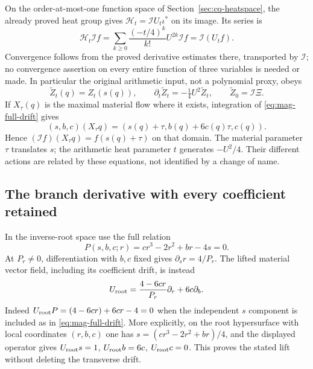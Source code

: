 On the order-at-most-one function space of
Section~\ref{sec:cq-heatspace}, the already proved heat group gives
$\mathscr H_t=\mathcal I U_t\iota^*$ on its image. Its series is
\[
 \mathscr H_t\mathcal I f
 =\sum_{k\ge0}\frac{(-t/4)^k}{k!}U^{2k}\mathcal I f
 =\mathcal I(U_tf).
\]
Convergence follows from the proved derivative estimates there, transported
by $\mathcal I$; no convergence assertion on every entire function of three
variables is needed or made. In particular the original arithmetic input,
not a polynomial proxy, obeys
\begin{equation}
 \widetilde Z_t(q)=Z_t(s(q)),\qquad
 \partial_t\widetilde Z_t=-\tfrac14U^2\widetilde Z_t,\qquad
 \widetilde Z_0=\mathcal I\Xi .
 \label{eq:mag-actual-heat}
\end{equation}
If $X_\tau(q)$ is the maximal material flow where it exists, integration
of \eqref{eq:mag-full-drift} gives
\[
 (s,b,c)(X_\tau q)=(s(q)+\tau,b(q)+6c(q)\tau,c(q)).
\]
Hence $(\mathcal I f)(X_\tau q)=f(s(q)+\tau)$ on that domain.
The material parameter $\tau$ translates $s$; the arithmetic heat
parameter $t$ generates $-U^2/4$. Their different actions are related
by these equations, not identified by a change of name.

\subsection{The branch derivative with every coefficient retained}

In the inverse-root space use the full relation
\[
 P(s,b,c;r)=cr^3-2r^2+br-4s=0.
\]
At $P_r\ne0$, differentiation with $b,c$ fixed gives
$\partial_s r=4/P_r$. The lifted material vector field, including its
coefficient drift, is instead
\begin{equation}
 U_{\rm root}=\frac{4-6cr}{P_r}\partial_r+6c\partial_b .
 \label{eq:mag-root-drift}
\end{equation}
Indeed $U_{\rm root}P=(4-6cr)+6cr-4=0$ when the independent $s$
component is included as in \eqref{eq:mag-full-drift}. More explicitly,
on the root hypersurface with local coordinates $(r,b,c)$ one has
$s=(cr^3-2r^2+br)/4$, and the displayed operator gives
$U_{\rm root}s=1$, $U_{\rm root}b=6c$, $U_{\rm root}c=0$.
This proves the stated lift without deleting the transverse drift.

